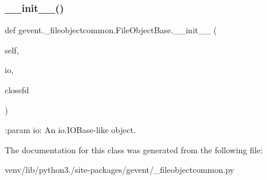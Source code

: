 \subsubsection{\texorpdfstring{\+\_\+\+\_\+init\+\_\+\+\_\+()}{\_\_init\_\_()}}
{\footnotesize\ttfamily def gevent.\+\_\+fileobjectcommon.\+File\+Object\+Base.\+\_\+\+\_\+init\+\_\+\+\_\+ (\begin{DoxyParamCaption}\item[{}]{self,  }\item[{}]{io,  }\item[{}]{closefd }\end{DoxyParamCaption})}

\begin{DoxyVerb}:param io: An io.IOBase-like object.
\end{DoxyVerb}
 

The documentation for this class was generated from the following file\+:\begin{DoxyCompactItemize}
\item 
venv/lib/python3./site-\/packages/gevent/\+\_\+fileobjectcommon.\+py\end{DoxyCompactItemize}
